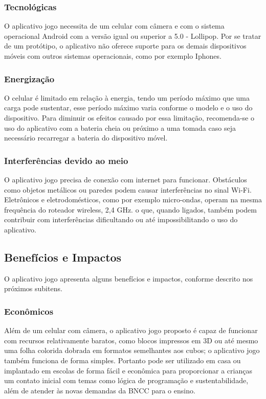         \subsubsection{Tecnológicas}
        O aplicativo jogo necessita de um celular com câmera e com o sistema operacional Android com a versão igual ou superior a 5.0 - Lollipop. Por se tratar de um protótipo, o aplicativo não oferece suporte para os demais dispositivos móveis com outros sistemas operacionais, como por exemplo Iphones. 
        
        \subsubsection{Energização}
        O celular é limitado em relação à energia, tendo um período máximo que uma carga pode sustentar, esse período máximo varia conforme o modelo e o uso do dispositivo. Para diminuir os efeitos causado por essa limitação, recomenda-se o uso do aplicativo com a bateria cheia ou próximo a uma tomada caso seja necessário recarregar a bateria do dispositivo móvel.    
        
        \subsubsection{Interferências devido ao meio}
        O aplicativo jogo precisa de conexão com internet para funcionar. Obstáculos como objetos metálicos ou paredes podem causar interferências no sinal Wi-Fi. Eletrônicos e eletrodomésticos, como por exemplo micro-ondas, operam na mesma frequência do roteador wireless, 2,4 GHz. o que, quando ligados,  também podem contribuir com interferências dificultando ou até impossibilitando o uso do aplicativo.
    
    \subsection{Benefícios e Impactos}
    O aplicativo jogo apresenta alguns benefícios e impactos, conforme descrito nos próximos subitens.

        \subsubsection{Econômicos}
        Além de um celular com câmera, o aplicativo jogo proposto é capaz de funcionar com recursos relativamente baratos, como blocos impressos em 3D ou até mesmo uma folha colorida dobrada em formatos semelhantes aos cubos; o aplicativo jogo também funciona de forma simples. Portanto pode ser utilizado em casa ou implantado em escolas de forma fácil e econômica para proporcionar a crianças um contato inicial com temas como lógica de programação e sustentabilidade, além de atender às novas demandas da BNCC para o ensino.
        
